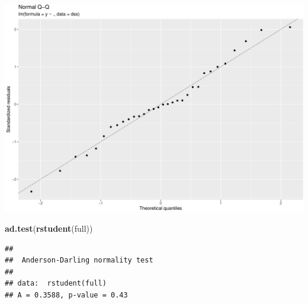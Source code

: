 \documentclass[
  ignorenonframetext,
]{beamer}
\newenvironment{Shaded}{\begin{snugshade}}{\end{snugshade}}
\newcommand{\KeywordTok}[1]{\textcolor[rgb]{0.13,0.29,0.53}{\textbf{#1}}}
\newcommand{\NormalTok}[1]{#1}
\begin{document}
\begin{frame}[fragile]
\includegraphics{L2_files/figure-beamer/unnamed-chunk-5-2.pdf}

\begin{Shaded}
\begin{Highlighting}[]
\KeywordTok{ad.test}\NormalTok{(}\KeywordTok{rstudent}\NormalTok{(full))}
\end{Highlighting}
\end{Shaded}

\begin{verbatim}
## 
##  Anderson-Darling normality test
## 
## data:  rstudent(full)
## A = 0.3588, p-value = 0.43
\end{verbatim}

\end{frame}
\end{document}
